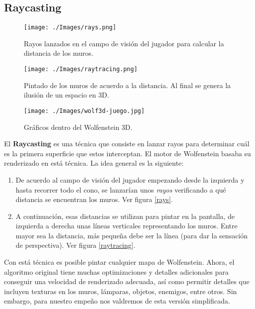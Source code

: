 \newpage
\subsection{Raycasting}

\begin{wrapfigure}{r}{0.4\textwidth}
	\begin{center}
		\texttt{[image: ./Images/rays.png]}
	\end{center}	
	\caption{Rayos lanzados en el campo de visión del jugador para calcular la distancia de los muros. \newline}
	\label{rays}
	
	\begin{center}
		\texttt{[image: ./Images/raytracing.png]}
	\end{center}	
	\caption{Pintado de los muros de acuerdo a la distancia. Al final se genera la ilusión de un espacio en 3D. \newline}
	\label{raytracing}
	
	\begin{center}
		\texttt{[image: ./Images/wolf3d-juego.jpg]}
	\end{center}
	\caption{Gráficos dentro del Wolfenstein 3D.}
	\label{wolf3d-inside}

\end{wrapfigure}

El \textbf{Raycasting} es una técnica que consiste en lanzar rayos para determinar cuál es la primera superficie que estos interceptan. El motor de Wolfenstein basaba su renderizado en está técnica. La idea general es la siguiente:

\begin{enumerate}
	\item De acuerdo al campo de visión del jugador empezando desde la izquierda y hasta recorrer todo el cono, se lanzarían unos \emph{rayos} verificando a qué distancia se encuentran los muros. Ver figura \ref{rays}.
	
	\item A continuación, esas distancias se utilizan para pintar en la pantalla, de izquierda a derecha unas líneas verticales representando los muros. Entre mayor sea la distancia, más pequeña debe ser la línea (para dar la sensación de perspectiva). Ver figura \ref{raytracing}.
\end{enumerate}

Con está técnica es posible pintar cualquier mapa de Wolfenstein. Ahora, el algoritmo original tiene muchas optimizaciones y detalles adicionales para conseguir una velocidad de renderizado adecuada, así como permitir detalles que incluyen texturas en los muros, lámparas, objetos, enemigos, entre otros. Sin embargo, para nuestro empeño nos valdremos de esta versión simplificada.

